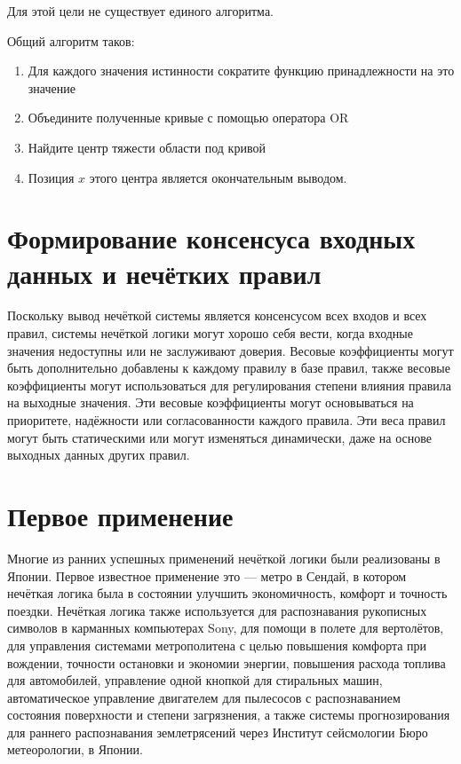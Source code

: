 \documentclass[a4paper,12pt]{report}
\begin{document}
Для этой цели не существует единого алгоритма.

Общий алгоритм таков:
\begin{enumerate}
	\item Для каждого значения истинности сократите функцию принадлежности на это значение
	\item Объедините полученные кривые с помощью оператора OR
	\item Найдите центр тяжести области под кривой
	\item Позиция \(x\) этого центра является окончательным выводом.
\end{enumerate}

\section{Формирование консенсуса входных данных и нечётких правил}
Поскольку вывод нечёткой системы является консенсусом всех входов и всех правил, системы нечёткой логики могут хорошо себя вести, когда входные значения недоступны или не заслуживают доверия. Весовые коэффициенты могут быть дополнительно добавлены к каждому правилу в базе правил, также весовые коэффициенты могут использоваться для регулирования степени влияния правила на выходные значения. Эти весовые коэффициенты могут основываться на приоритете, надёжности или согласованности каждого правила. Эти веса правил могут быть статическими или могут изменяться динамически, даже на основе выходных данных других правил.

\section{Первое применение}
Многие из ранних успешных применений нечёткой логики были реализованы в Японии. Первое известное применение это --- метро в Сендай, в котором нечёткая логика была в состоянии улучшить экономичность, комфорт и точность поездки. Нечёткая логика также используется для распознавания рукописных символов в карманных компьютерах Sony, для помощи в полете для вертолётов, для управления системами метрополитена с целью повышения комфорта при вождении, точности остановки и экономии энергии, повышения расхода топлива для автомобилей, управление одной кнопкой для стиральных машин, автоматическое управление двигателем для пылесосов с распознаванием состояния поверхности и степени загрязнения, а также системы прогнозирования для раннего распознавания землетрясений через Институт сейсмологии Бюро метеорологии, в Японии.
\end{document}
